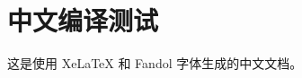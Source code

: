 \documentclass[UTF8,fontset=fandol]{ctexart}
\begin{document}
\section*{中文编译测试}
这是使用 XeLaTeX 和 Fandol 字体生成的中文文档。
\end{document}
